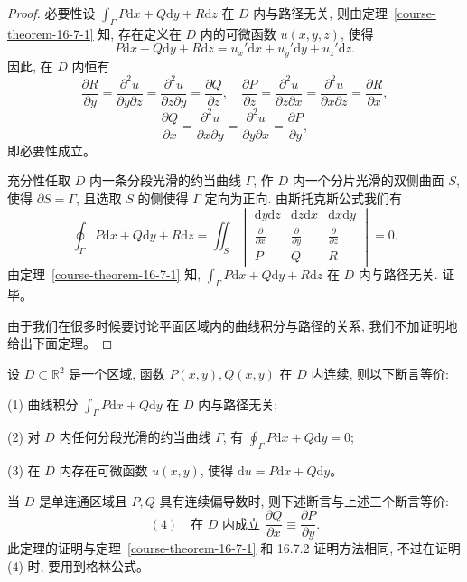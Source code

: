 \documentclass[12pt,fontset=fandol]{ctexart}
\begin{document}
\begin{proof}\quad 必要性\quad 设 $\int_\Gamma P\mathrm dx+Q\mathrm dy+R\mathrm dz$ 在 $D$ 内与路径无关, 则由定理~\ref{course-theorem-16-7-1}  知, 存在定义在 $D$ 内的可微函数 $u(x,y,z)$, 使得
\[
  P\mathrm dx+Q\mathrm dy+R\mathrm dz=u_x'\mathrm dx+u_y'\mathrm dy+u_z'\mathrm dz.
\]
因此, 在 $D$ 内恒有
\[
  \frac{\partial R}{\partial y}
  =\frac{\partial^2u}{\partial y\partial z}
  =\frac{\partial^2u}{\partial z\partial y}
  =\frac{\partial Q}{\partial z},
  \quad
  \frac{\partial P}{\partial z}
  =\frac{\partial^2u}{\partial z\partial x}
  =\frac{\partial^2u}{\partial x\partial z}
  =\frac{\partial R}{\partial x},
\]
\[
  \frac{\partial Q}{\partial x}
  =\frac{\partial^2u}{\partial x\partial y}
  =\frac{\partial^2u}{\partial y\partial x}
  =\frac{\partial P}{\partial y},
\]
即必要性成立。

充分性\quad 任取 $D$ 内一条分段光滑的约当曲线 $\Gamma$, 作 $D$ 内一个分片光滑的双侧曲面 $S$, 使得 $\partial S=\Gamma$, 且选取 $S$ 的侧使得 $\Gamma$ 定向为正向. 由斯托克斯公式我们有
\[
  \oint_\Gamma P\mathrm dx+Q\mathrm dy+R\mathrm dz
  =
  \iint_S
  \begin{vmatrix}
    \mathrm dy\mathrm dz&\mathrm dz\mathrm dx&\mathrm dx\mathrm dy\\
    \frac{\partial}{\partial x}&\frac{\partial}{\partial y}&\frac{\partial}{\partial z}\\
    P&Q&R
  \end{vmatrix}
  =0.
\]
由定理~\ref{course-theorem-16-7-1}  知, $\int_\Gamma P\mathrm dx+Q\mathrm dy+R\mathrm dz$ 在 $D$ 内与路径无关. 证毕。

由于我们在很多时候要讨论平面区域内的曲线积分与路径的关系, 我们不加证明地给出下面定理。

\end{proof}
\begin{theorem}\label{course-theorem-16-7-3}\quad 设 $D\subset\mathbb R^2$ 是一个区域, 函数 $P(x,y),Q(x,y)$ 在 $D$ 内连续, 则以下断言等价:

(1) 曲线积分 $\int_\Gamma P\mathrm dx+Q\mathrm dy$ 在 $D$ 内与路径无关;

(2) 对 $D$ 内任何分段光滑的约当曲线 $\Gamma$, 有 $\oint_\Gamma P\mathrm dx+Q\mathrm dy=0$;

(3) 在 $D$ 内存在可微函数 $u(x,y)$, 使得 $\mathrm du=P\mathrm dx+Q\mathrm dy$。

当 $D$ 是单连通区域且 $P,Q$ 具有连续偏导数时, 则下述断言与上述三个断言等价:
\[
  (4)\quad \text{在 }D\text{ 内成立 }\frac{\partial Q}{\partial x}\equiv\frac{\partial P}{\partial y}.
\]
此定理的证明与定理~\ref{course-theorem-16-7-1}  和 16.7.2 证明方法相同, 不过在证明 (4) 时, 要用到格林公式。

\end{theorem}
\end{document}
